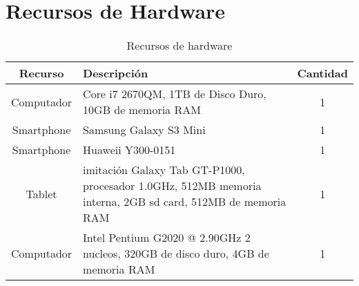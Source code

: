 \section{Recursos de Hardware}
  \begin{table}[!htb]
    \caption{Recursos de hardware}
    \begin{center}
      \begin{tabular}{|c|p{5cm}|c|}
        \hline
        Recurso & Descripción & Cantidad\\
        \hline \hline
        Computador & Core i7 2670QM, 1TB de Disco Duro, 10GB de memoria RAM & 1\\
        \hline
        Smartphone & Samsung Galaxy S3 Mini & 1\\
        \hline
        Smartphone & Huaweii Y300-0151 & 1\\
        \hline
        Tablet & imitación Galaxy Tab GT-P1000, procesador 1.0GHz, 512MB memoria interna, 2GB sd card, 512MB de memoria RAM & 1 \\
        \hline
        Computador & Intel Pentium G2020 @ 2.90GHz 2 nucleos, 320GB de disco duro, 4GB de memoria RAM & 1\\
        \hline
      \end{tabular}
    \end{center}
  \end{table} 
